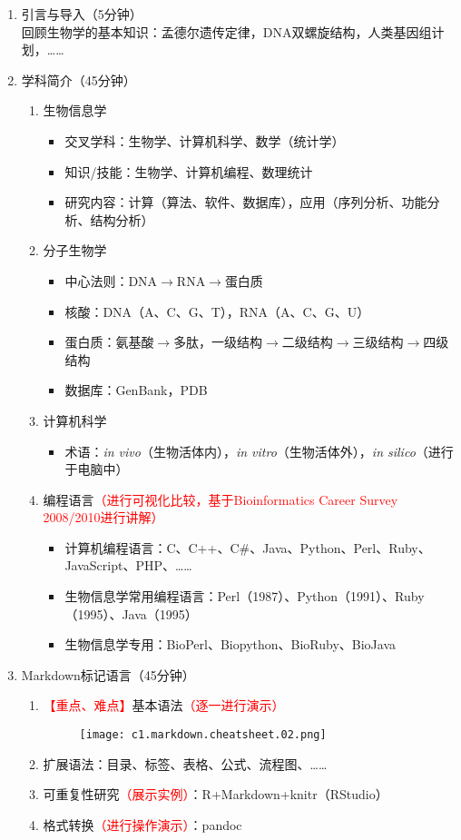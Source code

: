 \documentclass{TIJMUjiaoanLL}
\begin{document}
\begin{enumerate}
  \item 引言与导入（5分钟）
    \\回顾生物学的基本知识：孟德尔遗传定律，DNA双螺旋结构，人类基因组计划，……
  \item 学科简介（45分钟）
    \begin{enumerate}
      \item 生物信息学
	\begin{itemize}
	  \item 交叉学科：生物学、计算机科学、数学（统计学）
	  \item 知识/技能：生物学、计算机编程、数理统计
	  \item 研究内容：计算（算法、软件、数据库），应用（序列分析、功能分析、结构分析）
	\end{itemize}
      \item 分子生物学
	\begin{itemize}
	  \item 中心法则：DNA$\rightarrow$RNA$\rightarrow$蛋白质
	  \item 核酸：DNA（A、C、G、T），RNA（A、C、G、U）
	  \item 蛋白质：氨基酸$\rightarrow$多肽，一级结构$\rightarrow$二级结构$\rightarrow$三级结构$\rightarrow$四级结构
	  \item 数据库：GenBank，PDB
	\end{itemize}
      \item 计算机科学
	\begin{itemize}
	  \item 术语：\textit{in vivo}（生物活体内），\textit{in vitro}（生物活体外），\textit{in silico}（进行于电脑中）
	\end{itemize}
      \item 编程语言\textcolor{red}{（进行可视化比较，基于Bioinformatics Career Survey 2008/2010进行讲解）}
	\begin{itemize}
	  \item 计算机编程语言：C、C++、C\#、Java、Python、Perl、Ruby、JavaScript、PHP、……
	  \item 生物信息学常用编程语言：Perl（1987）、Python（1991）、Ruby（1995）、Java（1995）
	  \item 生物信息学专用：BioPerl、Biopython、BioRuby、BioJava
	\end{itemize}
    \end{enumerate}
  \item Markdown标记语言（45分钟）
    \begin{enumerate}
      \item \textcolor{red}{【重点、难点】}基本语法\textcolor{red}{（逐一进行演示）}
	\begin{figure}[h]
	  \centering
	  \texttt{[image: c1.markdown.cheatsheet.02.png]}
	\end{figure}
      \item 扩展语法：目录、标签、表格、公式、流程图、……
      \item 可重复性研究\textcolor{red}{（展示实例）}：R+Markdown+knitr（RStudio）
      \item 格式转换\textcolor{red}{（进行操作演示）}：pandoc
    \end{enumerate}


\end{enumerate}
\end{document}
